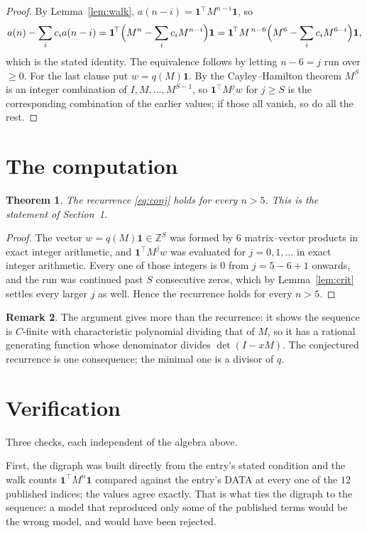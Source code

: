 \documentclass[11pt,a4paper]{article}
\theoremstyle{plain}
\newtheorem{theorem}{Theorem}
\theoremstyle{definition}
\newtheorem{remark}[theorem]{Remark}
\begin{document}
\begin{proof}
By Lemma~\ref{lem:walk}, $a(n-i)=\mathbf{1}^{\!\top}M^{n-i}\mathbf{1}$, so
\[
a(n)-\sum_i c_i a(n-i)
=\mathbf{1}^{\!\top}\Bigl(M^{n}-\sum_i c_i M^{n-i}\Bigr)\mathbf{1}
=\mathbf{1}^{\!\top}M^{\,n-6}\Bigl(M^{6}-\sum_i c_i M^{6-i}\Bigr)\mathbf{1},
\]
which is the stated identity. The equivalence follows by letting $n-6=j$ run over
$\ge0$. For the last clause put $w=q(M)\mathbf{1}$. By the Cayley--Hamilton theorem
$M^{S}$ is an integer combination of $I,M,\dots,M^{S-1}$, so
$\mathbf{1}^{\!\top}M^{j}w$ for $j\ge S$ is the corresponding combination of the
earlier values; if those all vanish, so do all the rest.
\end{proof}

\section{The computation}

\begin{theorem}
The recurrence \eqref{eq:conj} holds for every $n>5$. This is the statement of
Section~1.
\end{theorem}

\begin{proof}
The vector $w=q(M)\mathbf{1}\in\mathbb{Z}^{S}$ was formed by $6$ matrix--vector
products in exact integer arithmetic, and $\mathbf{1}^{\!\top}M^{j}w$ was evaluated for
$j=0,1,\dots$ in exact integer arithmetic. Every one of those integers is $0$ from
$j=5-6+1$ onwards, and the run was continued past $S$ consecutive zeros, which by
Lemma~\ref{lem:crit} settles every larger $j$ as well. Hence the recurrence holds for
every $n>5$.
\end{proof}

\begin{remark}
The argument gives more than the recurrence: it shows the sequence is $C$-finite with
characteristic polynomial dividing that of $M$, so it has a rational generating function
whose denominator divides $\det(I-xM)$. The conjectured recurrence is one consequence; the
minimal one is a divisor of $q$.
\end{remark}

\section{Verification}

Three checks, each independent of the algebra above.

First, the digraph was built directly from the entry's stated condition and the walk counts
$\mathbf{1}^{\!\top}M^{n}\mathbf{1}$ compared against the entry's DATA at every one of
the $12$ published indices; the values agree exactly. That is what ties the digraph to
the sequence: a model that reproduced only some of the published terms would be the wrong
model, and would have been rejected.
\end{document}
